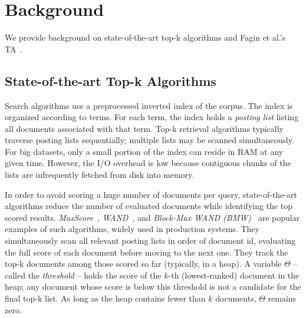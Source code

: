 
\section{Background}
\label{sec:background}

We  provide background on  state-of-the-art top-k algorithms and Fagin et al.'s TA~\cite{Fagin:2003}.

\subsection{State-of-the-art Top-k Algorithms}

Search algorithms use a preprocessed inverted index of the corpus. The index is organized according to terms. For each term, the index holds a \emph{posting list} listing all documents associated with that term. Top-k retrieval algorithms typically traverse  posting lists sequentially; multiple lists may be scanned simultaneously. For big datasets, only a small portion of the index can reside in RAM at any given time. However, the I/O overhead is low because 
contiguous chunks of the lists are infrequently fetched from disk into memory.

In order to avoid scoring a huge number of documents per query, state-of-the-art algorithms reduce the number of evaluated documents while identifying the top scored results. 
{\em MaxScore}~\cite{Strohman:2005,Turtle:1995}, {\em WAND}~\cite{Broder:2003}, and {\em Block-Max WAND (BMW)}~\cite{Ding:2011} are popular examples of such algorithms, widely used in production systems. 
They  simultaneously scan all relevant posting lists in order of document id, evaluating the full score of each document before moving to the next one. They track the top-k documents among those scored so far (typically, in a heap). A variable $\Theta$ -- called the \emph{threshold} -- holds the score of the $k$-th (lowest-ranked) document in the heap;  any document whose  score is below this threshold is not a candidate for the final top-k list. As long as the heap contains fewer than $k$ documents, $\Theta$ remains zero.

